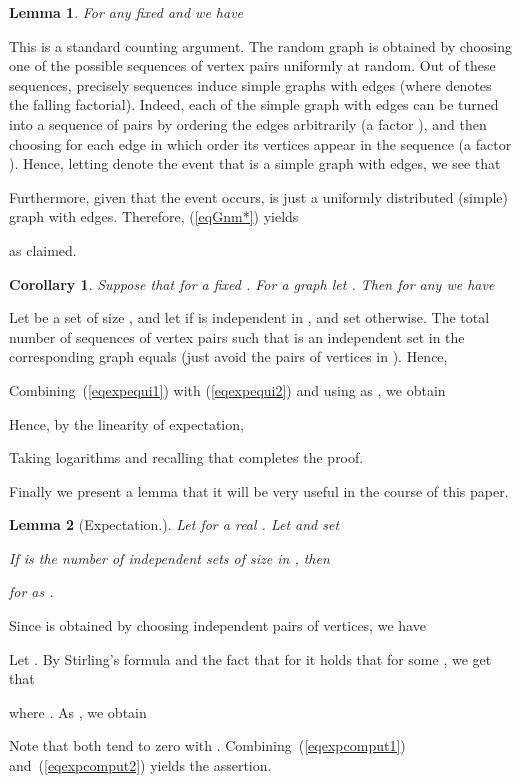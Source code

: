 \documentclass[a4paper,10pt]{article}
\makeatletter
\newtheorem{corollary}{Corollary}\renewcommand{\thecorollary}{\arabic{corollary}}
\newtheorem{lemma}{Lemma}\renewcommand{\thelemma}{\arabic{lemma}}
\newenvironment{proof}{\noindent{\bf Proof\@:}}{\hfill \\}
\makeatother
\begin{document}
\begin{lemma}\label{lemma:model-equivalence}
For any fixed  and  we have

\end{lemma}
\begin{proof}
This is a standard counting argument. The random graph  is
obtained by choosing one of the  possible sequences of vertex
pairs uniformly at random. Out of these  sequences, precisely
 sequences induce simple graphs with  edges (where
 denotes the falling factorial). Indeed, each of the
 simple graph with  edges can be turned into
a sequence of pairs by ordering the edges arbitrarily (a factor ),
and then choosing for each edge in which order its vertices appear in
the sequence (a factor ). Hence, letting  denote the event
that  is a simple graph with  edges, we see that
	
Furthermore, given that the event  occurs,  is
just a uniformly distributed (simple) graph with  edges. 
Therefore,  (\ref{eqGnm*}) yields
	
as claimed.
\end{proof}


\begin{corollary}\label{corollary:expectation-equivalence}
Suppose that  for a fixed .
For a graph  let .
Then for any  we have

\end{corollary}
\begin{proof}
Let  be a set of size , and let  if  is
independent in , and set  otherwise. The total number
of sequences of  vertex pairs such that  is an independent set
in the corresponding graph  equals
	 (just avoid the  pairs of vertices in ).
Hence,
	
Combining~(\ref{eqexpequi1}) with (\ref{eqexpequi2}) and using
 as , we obtain
	
Hence, by the linearity of expectation,
	
Taking logarithms and recalling that  completes the proof.
\end{proof}

\noindent
Finally we present a lemma that it will be very useful 
in the course of this paper.


\begin{lemma}[Expectation.]\label{lemma:expectation}
Let  for a real .
Let  and set
	
If  is the number of independent sets of size   in , then
	
for  as .
\end{lemma}
\begin{proof}
Since  is obtained by choosing  independent pairs of
vertices, we have

Let .
By Stirling's formula and the fact that for  it holds that
 for  some , we get
that

where .
As , we obtain

Note that both  tend to zero with .
Combining~(\ref{eqexpcomput1}) and~(\ref{eqexpcomput2}) 
yields the assertion.
\end{proof}
\end{document}
